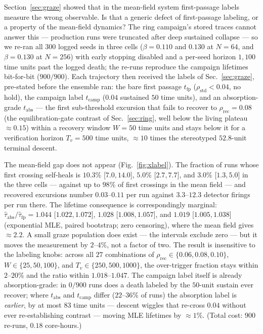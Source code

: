 Section~\ref{sec:graze} showed that in the mean-field system first-passage
labels measure the wrong observable. Is that a generic defect of
first-passage labeling, or a property of the mean-field dynamics? The ring
campaign's stored traces cannot answer this --- production runs were
truncated after deep sustained collapse --- so we re-ran all $300$ logged
seeds in three cells ($\beta = 0.110$ and $0.130$ at $N = 64$, and
$\beta = 0.130$ at $N = 256$) with early stopping disabled and a per-seed
horizon $1{,}100$ time units past the logged death; the re-runs reproduce
the campaign lifetimes bit-for-bit ($900/900$). Each trajectory then
received the labels of Sec.~\ref{sec:graze}, pre-stated before the ensemble
ran: the bare first passage $t_{\mathrm{fp}}$
($\rho_{\mathrm{std}} < 0.04$, no hold), the campaign label
$t_{\mathrm{camp}}$ ($0.04$ sustained $50$ time units), and an
absorption-grade $t_{\mathrm{abs}}$ --- the first sub-threshold excursion
that fails to recover to $\rho_{\mathrm{rec}} = 0.08$ (the equilibration-gate
contrast of Sec.~\ref{sec:ring}, well below the living plateau
${\approx}0.15$) within a recovery window $W = 50$ time units and stays
below it for a verification horizon $T_v = 500$ time units, ${\approx}10$
times the stereotyped $52.8$-unit terminal descent.

The mean-field gap does not appear (Fig.~\ref{fig:xlabel}). The fraction of
runs whose first crossing self-heals is $10.3\%$ [$7.0, 14.0$], $5.0\%$
[$2.7, 7.7$], and $3.0\%$ [$1.3, 5.0$] in the three cells --- against up to
$98\%$ of first crossings in the mean field --- and recovered excursions
number $0.03$--$0.11$ per run against $3.3$--$12.3$ detector firings per
run there. The lifetime consequence is correspondingly marginal:
$\hat\tau_{\mathrm{abs}}/\hat\tau_{\mathrm{fp}} = 1.044$ [$1.022, 1.072$],
$1.028$ [$1.008, 1.057$], and $1.019$ [$1.005, 1.038$] (exponential MLE,
paired bootstrap; zero censoring), where the mean field gives
${\approx}2.2$. A small graze population does exist --- the intervals
exclude zero --- but it moves the measurement by $2$--$4\%$, not a factor
of two. The result is insensitive to the labeling knobs: across all $27$
combinations of $\rho_{\mathrm{rec}} \in \{0.06, 0.08, 0.10\}$,
$W \in \{25, 50, 100\}$, and $T_v \in \{250, 500, 1000\}$, the over-trigger
fraction stays within $2$--$20\%$ and the ratio within $1.018$--$1.047$.
The campaign label itself is already absorption-grade: in $0/900$ runs does
a death labeled by the $50$-unit sustain ever recover; where
$t_{\mathrm{abs}}$ and $t_{\mathrm{camp}}$ differ ($22$--$36\%$ of runs)
the absorption label is \emph{earlier}, by at most $83$ time units ---
descent wiggles that re-cross $0.04$ without ever re-establishing contrast
--- moving MLE lifetimes by ${\approx}1\%$. (Total cost: $900$ re-runs,
$0.18$ core-hours.)

